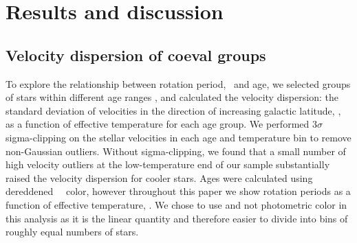 \section{Results and discussion}
\label{sec:results}

\subsection{Velocity dispersion of coeval groups}

To explore the relationship between rotation period, \teff\ and age, we
selected groups of stars within different age ranges \citep[where age was
calculated using the][gyrochronology relation]{angus2019}, and calculated the
velocity dispersion: the standard deviation of velocities in the direction of
increasing galactic latitude, \sigmavb, as a function of effective temperature
for each age group.
We performed 3$\sigma$ sigma-clipping on the stellar velocities in each age
and temperature bin to remove non-Gaussian outliers.
Without sigma-clipping, we found that a small number of high velocity
outliers at the low-temperature end of our sample substantially raised the
velocity dispersion for cooler stars.
Ages were calculated using dereddened \gaia\ \gcolor\ color, however
throughout this paper we show rotation periods as a function of effective
temperature, \teff.
We chose to use \teff and not photometric color in this analysis as it is the
linear quantity and therefore easier to divide into bins of roughly equal
numbers of stars.

